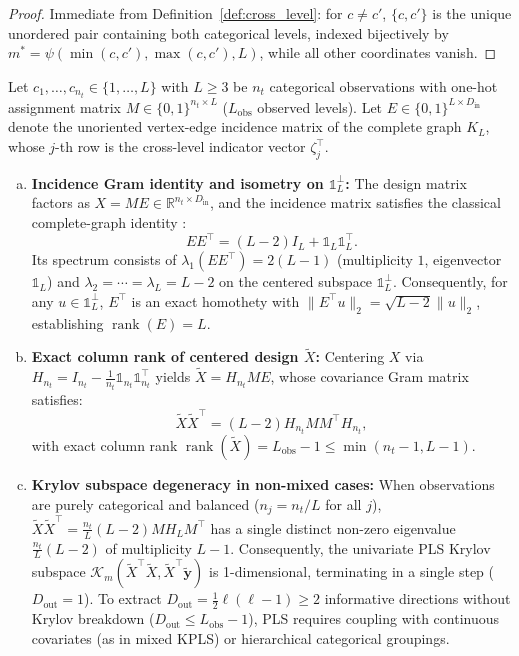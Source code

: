 \documentclass[default,sn-mathphys,Numbered]{sn-jnl}
\theoremstyle{thmstyleone}
\theoremstyle{thmstylethree}
\theoremstyle{thmstyletwo}
\newcommand{\inp}{\text{in}}
\newcommand{\outp}{\text{out}}
\newcommand{\rank}{\operatorname{rank}}
\begin{document}
\begin{proof}
Immediate from Definition~\ref{def:cross_level}: for $c \neq c'$, $\{c, c'\}$ is the unique unordered pair containing both categorical levels, indexed bijectively by $m^* = \psi(\min(c, c'), \max(c, c'), L)$, while all other coordinates vanish.
\end{proof}


Let $c_1, \ldots, c_{n_t} \in \{1, \ldots, L\}$ with $L \ge 3$ be $n_t$ categorical observations with one-hot assignment matrix $M \in \{0, 1\}^{n_t \times L}$ ($L_{\mathrm{obs}}$ observed levels). Let $E \in \{0, 1\}^{L \times D_{\inp}}$ denote the unoriented vertex-edge incidence matrix of the complete graph $K_L$, whose $j$-th row is the cross-level indicator vector $\zeta_j^\top$.
\begin{enumerate}[(a)]
    \item[(a)] \textbf{Incidence Gram identity and isometry on $\mathds{1}_L^\perp$:} The design matrix factors as $X = M E \in \mathbb{R}^{n_t \times D_{\inp}}$, and the incidence matrix satisfies the classical complete-graph identity \citep[Section~8.2]{godsil2001algebraic}:
    \begin{equation}
    \label{eq:incidence_gram}
    E E^\top = (L - 2) I_L + \mathds{1}_L \mathds{1}_L^\top.
    \end{equation}
    Its spectrum consists of $\lambda_1(E E^\top) = 2(L - 1)$ (multiplicity $1$, eigenvector $\mathds{1}_L$) and $\lambda_2 = \cdots = \lambda_L = L - 2$ on the centered subspace $\mathds{1}_L^\perp$. Consequently, for any $u \in \mathds{1}_L^\perp$, $E^\top$ is an exact homothety with $\|E^\top u\|_2 = \sqrt{L - 2} \|u\|_2$, establishing $\rank(E) = L$.
    \item[(b)] \textbf{Exact column rank of centered design $\tilde{X}$:} Centering $X$ via $H_{n_t} = I_{n_t} - \frac{1}{n_t}\mathds{1}_{n_t}\mathds{1}_{n_t}^\top$ yields $\tilde{X} = H_{n_t} M E$, whose covariance Gram matrix satisfies:
    \begin{equation}
    \label{eq:centered_gram_factor}
    \tilde{X} \tilde{X}^\top = (L - 2) H_{n_t} M M^\top H_{n_t},
    \end{equation}
    with exact column rank $\rank(\tilde{X}) = L_{\mathrm{obs}} - 1 \le \min(n_t - 1, L - 1)$.
    \item[(c)] \textbf{Krylov subspace degeneracy in non-mixed cases:} When observations are purely categorical and balanced ($n_j = n_t / L$ for all $j$), $\tilde{X}\tilde{X}^\top = \frac{n_t}{L}(L - 2) M H_L M^\top$ has a single distinct non-zero eigenvalue $\frac{n_t}{L}(L - 2)$ of multiplicity $L - 1$. Consequently, the univariate PLS Krylov subspace $\mathcal{K}_m(\tilde{X}^\top \tilde{X}, \tilde{X}^\top \tilde{\bm{y}})$ is 1-dimensional, terminating in a single step ($D_{\outp} = 1$). To extract $D_{\outp} = \frac{1}{2}\ell(\ell-1) \ge 2$ informative directions without Krylov breakdown ($D_{\outp} \le L_{\mathrm{obs}} - 1$), PLS requires coupling with continuous covariates (as in mixed KPLS) or hierarchical categorical groupings.
\end{enumerate}
\end{document}
